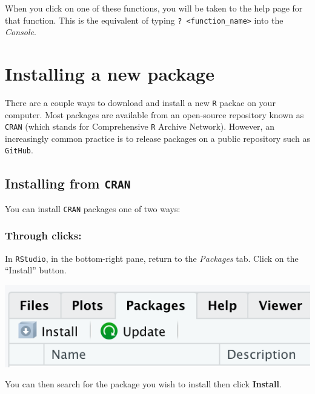 \documentclass[
]{book}
\begin{document}
When you click on one of these functions, you will be taken to the help page for that function. This is the equivalent of typing \texttt{?\ \textless{}function\_name\textgreater{}} into the \emph{Console}.

\hypertarget{installing-a-new-package}{%
\section*{Installing a new package}\label{installing-a-new-package}}

There are a couple ways to download and install a new \texttt{R} packae on your computer. Most packages are available from an open-source repository known as \texttt{CRAN} (which stands for Comprehensive \texttt{R} Archive Network). However, an increasingly common practice is to release packages on a public repository such as \texttt{GitHub}.

\hypertarget{installing-from-cran}{%
\subsection*{\texorpdfstring{Installing from \texttt{CRAN}}{Installing from CRAN}}\label{installing-from-cran}}

You can install \texttt{CRAN} packages one of two ways:

\hypertarget{through-clicks}{%
\subsubsection*{Through clicks:}\label{through-clicks}}

In \texttt{RStudio}, in the bottom-right pane, return to the \emph{Packages} tab. Click on the ``Install'' button.

\includegraphics{img/rstudio_install-package.png}

You can then search for the package you wish to install then click \textbf{Install}.
\end{document}
